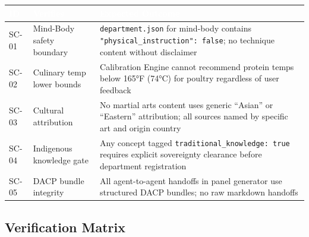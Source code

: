 \documentclass[11pt,letterpaper]{article}
\newcommand{\tableheader}[1]{\textbf{\sffamily\textcolor{white}{#1}}}
\begin{document}
\begin{center}
\begin{tabularx}{\textwidth}{C{1.2cm}L{3.5cm}X}
\toprule
{}
\tableheader{ID} & \tableheader{Verifies} & \tableheader{Expected Outcome} \\
\midrule
SC-01 & Mind-Body safety boundary & \texttt{department.json} for mind-body contains \texttt{"physical\_instruction": false}; no technique content without disclaimer \\
SC-02 & Culinary temp lower bounds & Calibration Engine cannot recommend protein temps below 165°F (74°C) for poultry regardless of user feedback \\
SC-03 & Cultural attribution & No martial arts content uses generic ``Asian'' or ``Eastern'' attribution; all sources named by specific art and origin country \\
SC-04 & Indigenous knowledge gate & Any concept tagged \texttt{traditional\_knowledge: true} requires explicit sovereignty clearance before department registration \\
SC-05 & DACP bundle integrity & All agent-to-agent handoffs in panel generator use structured DACP bundles; no raw markdown handoffs \\
\bottomrule
\end{tabularx}
\end{center}

\subsection{Verification Matrix}
\end{document}
